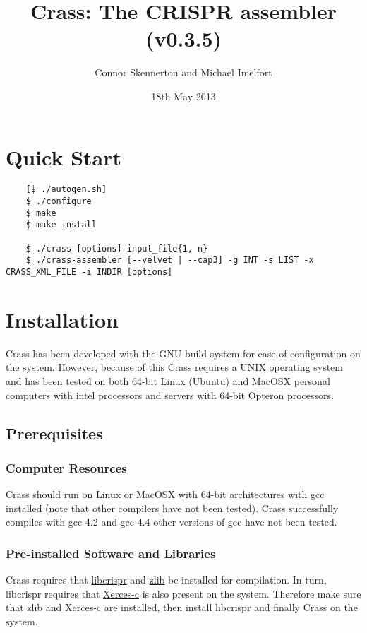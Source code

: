 \documentclass[11pt]{article} %
\title{Crass:  The CRISPR assembler (v0.3.5)}
\author{Connor Skennerton and Michael Imelfort}
\date{18th May 2013} %
\begin{document}
\maketitle

\tableofcontents
\section{Quick Start}
\begin{lstlisting}
	[$ ./autogen.sh]
	$ ./configure
	$ make
	$ make install
	
	$ ./crass [options] input_file{1, n}
    $ ./crass-assembler [--velvet | --cap3] -g INT -s LIST -x CRASS_XML_FILE -i INDIR [options]
\end{lstlisting}
\section{Installation}
Crass has been developed with the GNU build system for ease of configuration on the system.  However, because of this Crass requires a UNIX operating system and has been tested on both 64-bit Linux (Ubuntu) and MacOSX personal computers with intel processors and servers with 64-bit Opteron processors.
\subsection{Prerequisites}
\subsubsection{Computer Resources}
Crass should run on Linux or MacOSX with 64-bit architectures with gcc installed (note that other compilers have not been tested).  Crass successfully compiles with gcc 4.2 and gcc 4.4 other versions of gcc have not been tested.    

\subsubsection{Pre-installed Software and Libraries}
Crass requires that \href{http://ctskennerton.github.com/libcrispr}{libcrispr} and \href{www.zlib.net}{zlib} be installed for compilation.
In turn, libcrispr requires that  \href{http://xerces.apache.org/}{Xerces-c} is also present on the system.  Therefore make sure that zlib and Xerces-c are installed, then install libcrispr and finally Crass on the system.
\end{document}

